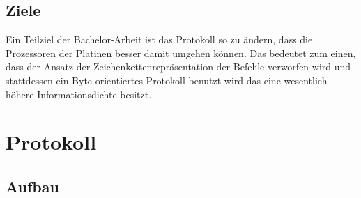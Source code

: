 \documentclass[a4paper]{article}
\begin{document}
	\subsection{Ziele}

	Ein Teilziel der Bachelor-Arbeit ist das Protokoll so zu ändern, dass die Prozessoren der Platinen besser damit umgehen können.
	Das bedeutet zum einen, dass der Ansatz der Zeichenkettenrepräsentation der Befehle verworfen wird und stattdessen ein 
	Byte-orientiertes Protokoll benutzt wird das eine wesentlich höhere Informationsdichte besitzt.


	\section{Protokoll}

	\subsection{Aufbau}
\end{document}
